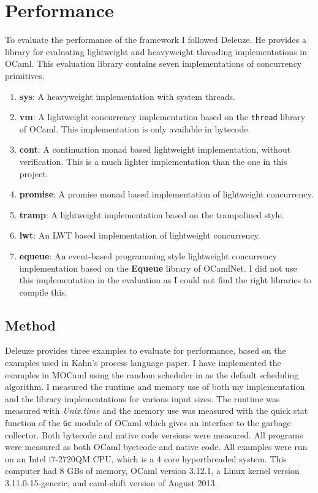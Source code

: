 \documentclass[12pt,twoside,notitlepage]{report}
\theoremstyle{plain}%
\theoremstyle{definition}
\theoremstyle{remark}
\begin{document}
\section{Performance}
\label{sec:performance_eval}
To evaluate the performance of the framework I followed Deleuze\cite{deleuzelight}. He provides a library for evaluating lightweight and heavyweight threading implementations in OCaml. This evaluation library contains seven implementations of concurrency primitives.
\begin{enumerate}
\item{\textbf{sys}: A heavyweight implementation with system threads.}
\item{\textbf{vm}: A lightweight concurrency implementation based on the \verb|thread| library of OCaml. This implementation is only available in bytecode.}
\item{\textbf{cont}: A continuation monad based lightweight implementation\cite[p.~12-13]{deleuzelight}, without verification. This is a much lighter implementation than the one in this project.}
\item{\textbf{promise}: A promise monad based implementation of lightweight concurrency\cite[p.~13-15]{deleuzelight}.}
\item{\textbf{tramp}: A lightweight implementation based on the trampolined style\cite[p.~11-12]{deleuzelight}.}
\item{\textbf{lwt}: An LWT\cite{LWT} based implementation of lightweight concurrency.}
\item{\textbf{equeue}: An event-based programming style lightweight concurrency implementation\cite[p.~15-18]{deleuzelight} based on the \textbf{Equeue} library of OCamlNet. I did not use this implementation in the evaluation as I could not find the right libraries to compile this.}
\end{enumerate}
\subsection{Method}
Deleuze provides three examples to evaluate for performance, based on the examples used in Kahn's process language paper\cite{kahn1976coroutines}. I have implemented the examples in MOCaml using the random scheduler in  as the default scheduling algorithm. I measured the runtime and memory use of both my implementation and the library implementations for various input sizes. The runtime was measured with \textit{Unix.time} and the memory use was measured with the quick stat function of the \verb|Gc| module of OCaml which gives an interface to the garbage collector. Both bytecode and native code versions were measured. All programs were measured as both OCaml byetcode and native code. All examples were run on an Intel i7-2720QM CPU, which is a 4 core hyperthreaded system. This computer had 8 GBs of memory, OCaml version 3.12.1, a Linux kernel version 3.11.0-15-generic, and caml-shift version of August 2013.
\end{document}
